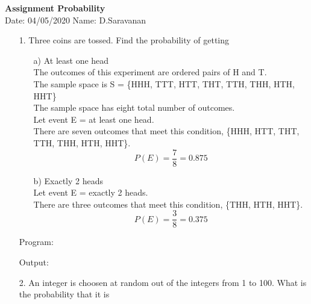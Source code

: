 \documentclass[a4paper,11pt,openright]{report}
\begin{document}
\singlespacing
\pagestyle{plain}

\begin{center}
\textbf{Assignment Probability} \\
Date: 04/05/2020 \hspace{2mm} Name: D.Saravanan
\end{center}

\vspace{10px}

\begin{enumerate}

\item[1.] Three coins are tossed. Find the probability of getting
\begin{enumerate}

\item[a)] At least one head \\
The outcomes of this experiment are ordered pairs of H and T. \\
The sample space is S = \{HHH, TTT, HTT, THT, TTH, THH, HTH, HHT\} \\
The sample space has eight total number of outcomes. \\
Let event E =  at least one head. \\
There are seven outcomes that meet this condition, 
 \{HHH, HTT, THT, TTH, THH, HTH, HHT\}.\\
\begin{equation*}
P(E) = \frac{7}{8} = 0.875	
\end{equation*}

\item[b)] Exactly 2 heads \\
Let event E = exactly 2 heads. \\
There are three outcomes that meet this condition,
\{THH, HTH, HHT\}. \\
\begin{equation*}
P(E) = \frac{3}{8} = 0.375
\end{equation*}

\end{enumerate}
\vspace{5px}

Program:


\pagebreak

Output:


\vspace{30px}

\item[2.] An integer is choosen at random out of the integers from 1 to 100. What is the
probability that it is


\end{enumerate}
\end{document}
